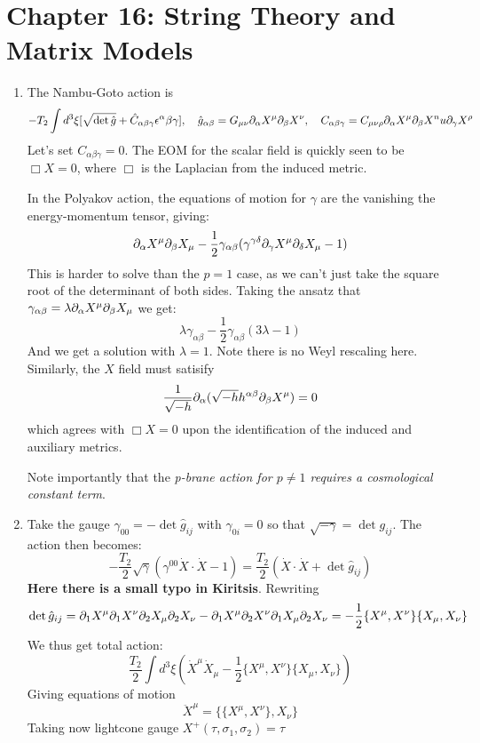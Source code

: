 \documentclass[11pt, class=article, crop=false]{standalone}
\begin{document}
\section*{Chapter 16: String Theory and Matrix Models} %
\label{sec:chapter_16_string_theory_and_matrix_models}

\begin{enumerate}
	\item The Nambu-Goto action is
	\[
		-T_2 \int d^3 \xi [\sqrt{\det \hat g} + \hat C_{\alpha \beta \gamma} \epsilon^\alpha \beta \gamma], \quad \hat g_{\alpha \beta} = G_{\mu \nu} \partial_\alpha X^\mu \partial_\beta X^\nu, \quad C_{\alpha \beta \gamma} = C_{\mu \nu \rho} \partial_\alpha X^\mu \partial_\beta X^nu \partial_\gamma X^\rho
	\]
	 Let's set $C_{\alpha \beta \gamma} = 0$. The EOM for the scalar field is quickly seen to be $\Box X = 0$, where $\Box$ is the Laplacian from the induced metric. 
	 
	 In the Polyakov action, the equations of motion for $\gamma$ are the vanishing the energy-momentum tensor, giving:
	 \[
	 	\partial_\alpha X^\mu \partial_\beta X_\mu - \frac12 \gamma_{\alpha \beta} ( \gamma^{\gamma \delta} \partial_\gamma X^\mu \partial_\delta X_\mu - 1)
	 \]
	 This is harder to solve than the $p=1$ case, as we can't just take the square root of the determinant of both sides. Taking the ansatz that $\gamma_{\alpha \beta} = \lambda \partial_\alpha X^\mu \partial_\beta X_\mu$ we get:
	 \[
	 	\lambda \gamma_{\alpha \beta} - \frac12 \gamma_{\alpha \beta}(3 \lambda - 1 )
	 \]
	 And we get a solution with $\lambda = 1$. Note there is no Weyl rescaling here. Similarly, the $X$ field must satisify
	 \[
	 	\frac{1}{\sqrt{-h}} \partial_\alpha (\sqrt{-h} h^{\alpha \beta} \partial_\beta X^\mu) = 0
	 \]
	 which agrees with $\Box X = 0$ upon the identification of the induced and auxiliary metrics. 
	
	
	Note importantly that the \emph{p-brane action for $p\neq 1$ requires a cosmological constant term}.
	
	\item Take the gauge $\gamma_{00} = -\det \hat g_{ij}$ with $\gamma_{0i} = 0$ so that $\sqrt{-\gamma} = \det g_{ij}$. The action then becomes:
	\[
		-\frac{T_2}{2}  \sqrt{\gamma} \left(\gamma^{00} \dot X \cdot \dot X - 1 \right) = \frac{T_2}{2} ( \dot X \cdot \dot X  + \det \hat g_{ij})
	\]
	\textbf{Here there is a small typo in Kiritsis}. Rewriting 
	\[
		\det \hat g_{ij} = \partial_1 X^\mu \partial_1 X^\nu \partial_2 X_\mu \partial_2 X_\nu - \partial_1 X^\mu \partial_2 X^\nu \partial_1 X_\mu \partial_2 X_\nu = - \frac12 \{X^\mu, X^\nu\} \{X_{\mu}, X_{\nu}\}
	\]
	We thus get total action:
	\[
		\frac{T_2}{2} \int d^3 \xi \left(\dot X^\mu \dot X_\mu - \frac12 \{X^\mu, X^\nu\} \{X_{\mu}, X_{\nu}\} \right)
	\]
	Giving equations of motion 
	\[
		\ddot X^\mu = \{ \{X^\mu, X^\nu \}, X_\nu \}
	\]
	Taking now lightcone gauge $X^+(\tau, \sigma_1, \sigma_2) = \tau$
	

\end{enumerate}
\end{document}
